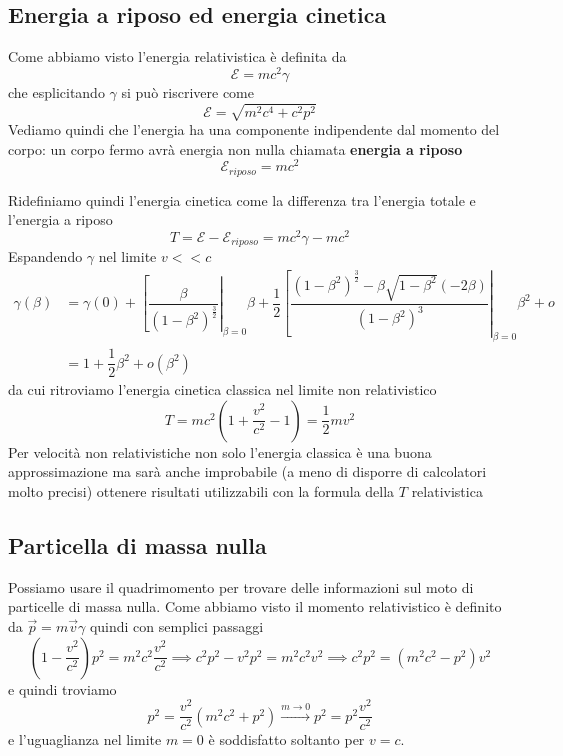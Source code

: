 \documentclass[12pt,a4paper,titlepage, twoside, openright]{book}
\numberwithin{equation}{chapter}
\begin{document}
\subsection{Energia a riposo ed energia cinetica}
Come abbiamo visto l'energia relativistica è definita da
\[
\mathcal{E}=mc^2\gamma
\]
che esplicitando $\gamma$ si può riscrivere come
\begin{equation}
\mathcal{E}=\sqrt{m^2c^4+c^2p^2}
\end{equation}
Vediamo quindi che l'energia ha una componente indipendente dal momento del corpo:
un corpo fermo avrà energia non nulla chiamata \textbf{energia a riposo} \[\mathcal{E}_{riposo}=mc^2\]

Ridefiniamo quindi l'energia cinetica come la differenza tra l'energia totale e l'energia a riposo
\begin{equation}
T=\mathcal{E}-\mathcal{E}_{riposo}=mc^2\gamma - mc^2
\end{equation}
Espandendo $\gamma$ nel limite $v<<c$ 
\begin{align*}
\gamma(\beta) &=\gamma(0)+\left[ \dfrac{\beta}{(1-\beta^2)^\frac{3}{2}}\right|_{\beta=0}\beta +\dfrac{1}{2}\left[ \dfrac{(1-\beta^2)^\frac{3}{2} - \beta\sqrt{1-\beta^2}(-2\beta)}{(1-\beta^2)^3}
\right|_{\beta=0}\beta^2 +o \\ &= 1 +\dfrac{1}{2}\beta^2 +o(\beta^2) 
\end{align*}
da cui ritroviamo l'energia cinetica classica nel limite non relativistico
\[
T=mc^2\left(1+\dfrac{v^2}{c^2}-1\right)=\dfrac{1}{2}mv^2
\]
{\footnotesize Per velocità non relativistiche non solo l'energia classica è una buona approssimazione ma sarà anche improbabile (a meno di disporre di calcolatori molto precisi) ottenere risultati utilizzabili con la formula della $T$ relativistica }
\subsection{Particella di massa nulla}

Possiamo usare il quadrimomento per trovare delle informazioni sul moto di particelle di massa nulla.
Come abbiamo visto il momento relativistico è definito da $\vec{p}=m\vec{v}\gamma$
quindi con semplici passaggi
 \[
\left( 1-\dfrac{v^2}{c^2} \right) p^2 = m^2 c^2 \dfrac{v^2}{c^2} \implies c^2 p^2 -v^2p^2=m^2c^2v^2 \implies c^2p^2=\left( m^2c^2-p^2 \right) v^2
\]
e quindi troviamo
\[
p^2=\dfrac{v^2}{c^2}(m^2c^2+p^2)\overset{m\rightarrow 0}{\longrightarrow} p^2=p^2\dfrac{v^2}{c^2}
\]
e l'uguaglianza nel limite $m=0$ è soddisfatto soltanto per $v=c$.
\end{document}
